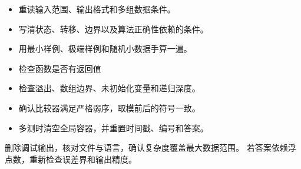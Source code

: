 \begin{icpcresult}[读题与建模]
  \begin{itemize}
    \item 重读输入范围、输出格式和多组数据条件。
    \item 写清状态、转移、边界以及算法正确性依赖的条件。
    \item 用最小样例、极端样例和随机小数据手算一遍。
  \end{itemize}
\end{icpcresult}

\begin{icpcwarning}[实现检查]
  \begin{itemize}
    \item 检查函数是否有返回值
    \item 检查溢出、数组边界、未初始化变量和递归深度。
    \item 确认比较器满足严格弱序，取模前后的符号一致。
    \item 多测时清空全局容器，并重置时间戳、编号和答案。
  \end{itemize}
\end{icpcwarning}

\begin{icpcnote}[提交前]
  删除调试输出，核对文件与语言，确认复杂度覆盖最大数据范围。
  若答案依赖浮点数，重新检查误差界和输出精度。
\end{icpcnote}
